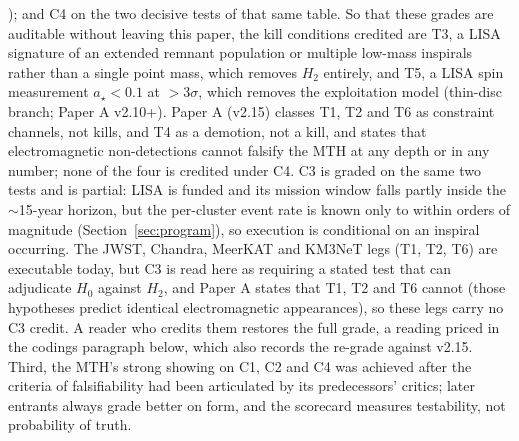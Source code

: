 \documentclass[11pt]{article}
\newcommand{\astar}{\ensuremath{a_\star}}
\begin{document}
); and C4 on the two decisive tests of that same table. So that these grades are auditable without leaving this paper, the kill conditions credited are T3, a LISA signature of an extended remnant population or multiple low-mass inspirals rather than a single point mass, which removes $H_2$ entirely, and T5, a LISA spin measurement $\astar<0.1$ at $>3\sigma$, which removes the exploitation model (thin-disc branch; Paper A v2.10+). Paper A (v2.15) classes T1, T2 and T6 as constraint channels, not kills, and T4 as a demotion, not a kill, and states that electromagnetic non-detections cannot falsify the MTH at any depth or in any number; none of the four is credited under C4. C3 is graded on the same two tests and is partial: LISA is funded and its mission window falls partly inside the $\sim$15-year horizon, but the per-cluster event rate is known only to within orders of magnitude (Section~\ref{sec:program}), so execution is conditional on an inspiral occurring. The JWST, Chandra, MeerKAT and KM3NeT legs (T1, T2, T6) are executable today, but C3 is read here as requiring a stated test that can adjudicate $H_0$ against $H_2$, and Paper A states that T1, T2 and T6 cannot (those hypotheses predict identical electromagnetic appearances), so these legs carry no C3 credit. A reader who credits them restores the full grade, a reading priced in the codings paragraph below, which also records the re-grade against v2.15. Third, the MTH's strong showing on C1, C2 and C4 was achieved after the criteria of falsifiability had been articulated by its predecessors' critics; later entrants always grade better on form, and the scorecard measures testability, not probability of truth.
\end{document}
